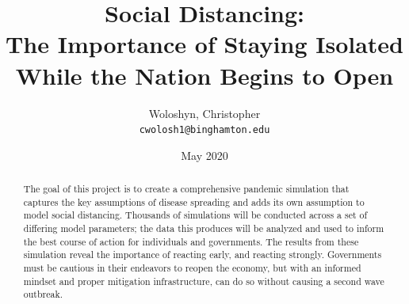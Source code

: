 \documentclass[12pt]{article}
\title{Social Distancing:\\\large The Importance of Staying Isolated While the Nation Begins to Open}
\author{Woloshyn, Christopher\\
\texttt{cwolosh1@binghamton.edu}}
\date{May 2020}
\begin{document}
\maketitle

\begin{abstract}
The goal of this project is to create a comprehensive pandemic simulation that captures the key assumptions of disease spreading and adds its own assumption to model social distancing.
Thousands of simulations will be conducted across a set of differing model parameters; the data this produces will be analyzed and used to inform the best course of action for individuals and governments.
The results from these simulation reveal the importance of reacting early, and reacting strongly.
Governments must be cautious in their endeavors to reopen the economy, but with an informed mindset and proper mitigation infrastructure, can do so without causing a second wave outbreak.
\end{abstract}
\end{document}
